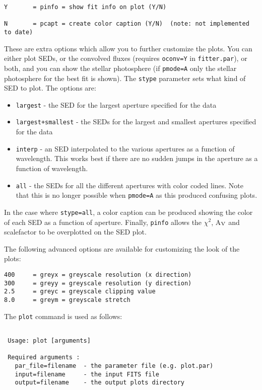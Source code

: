 \documentclass[letterpaper,11pt]{report}
\begin{document}
\begin{itemize}
\begin{verbatim}
Y       = pinfo = show fit info on plot (Y/N)

N       = pcapt = create color caption (Y/N)  (note: not implemented to date)
\end{verbatim}

These are extra options which allow you to further customize the plots. You can either plot SEDs, or the convolved fluxes (requires \texttt{oconv=Y} in \texttt{fitter.par}), or both, and you can show the stellar photosphere (if \texttt{pmode=A} only the stellar photosphere for the best fit is shown). The \texttt{stype} parameter sets what kind of SED to plot. The options are:

\begin{itemize}
\item \texttt{largest} - the SED for the largest aperture specified for the data
\item \texttt{largest+smallest} - the SEDs for the largest and smallest apertures specified for the data
\item \texttt{interp} - an SED interpolated to the various apertures as a function of wavelength. This works best if there are no sudden jumps in the aperture as a function of wavelength.
\item \texttt{all} - the SEDs for all the different apertures with color coded lines. Note that this is no longer possible when \texttt{pmode=A} as this produced confusing plots. 
\end{itemize}

In the case where \texttt{stype=all}, a color caption can be produced showing the color of each SED as a function of aperture. Finally, \texttt{pinfo} allows the $\chi^2$, A$_{\rm V}$ and scalefactor to be overplotted on the SED plot.\\
\end{itemize}
The following advanced options are available for customizing the look of the plots:

\begin{verbatim}
400     = greyx = greyscale resolution (x direction)
300     = greyy = greyscale resolution (y direction)
2.5     = greyc = greyscale clipping value
8.0     = greym = greyscale stretch
\end{verbatim}

The \texttt{plot} command is used as follows:

\begin{Verbatim}[frame=single,label=Syntax]

 Usage: plot [arguments]
 
 Required arguments :
   par_file=filename  - the parameter file (e.g. plot.par)
   input=filename     - the input FITS file
   output=filename    - the output plots directory
 
 \end{Verbatim}
\end{document}
